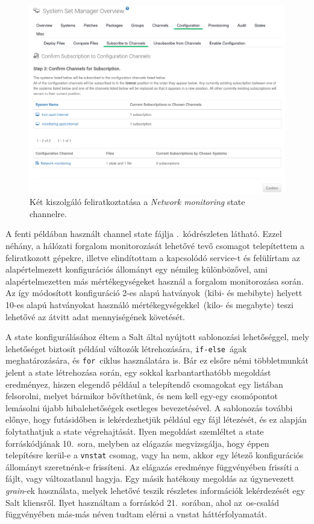 \begin{figure}[ht]
	\centering
	\includegraphics[width=15cm]{figures/uyuni-channelsub.png}
	\caption{Két kiszolgáló feliratkoztatása a \textit{Network monitoring} state channelre.}
	\label{fig:uyuni-channelsub}
\end{figure}

A fenti példában használt channel state fájlja .~kódrészleten látható. Ezzel néhány, a hálózati forgalom monitorozását lehetővé tevő csomagot telepítettem a feliratkozott gépekre, illetve elindítottam a kapcsolódó service-t és felülírtam az alapértelmezett konfigurációs állományt egy némileg különbözővel, ami alapértelmezetten más mértékegységeket használ a forgalom monitorozása során. Az így módosított konfiguráció 2-es alapú hatványok~(kibi- és mebibyte) helyett 10-es alapú hatványokat használó mértékegységekkel~(kilo- és megabyte) teszi lehetővé az átvitt adat mennyiségének követését.

A state konfigurálásához éltem a Salt által nyújtott sablonozási lehetőséggel, mely lehetőséget biztosít például változók létrehozására, \texttt{if-else}~ágak meghatározására, és \texttt{for}~ciklus használatára is. Bár ez elsőre némi többletmunkát jelent a state létrehozása során, egy sokkal karbantarthatóbb megoldást eredményez, hiszen elegendő például a telepítendő csomagokat egy listában felsorolni, melyet bármikor bővíthetünk, és nem kell egy-egy csomópontot lemásolni újabb hibalehetőségek esetleges bevezetésével. A sablonozás további előnye, hogy futásidőben is lekérdezhetjük például egy fájl létezését, és ez alapján folytathatjuk a state végrehajtását. Ilyen megoldást szemléltet a state forráskódjának 10.~sora, melyben az elágazás megvizsgálja, hogy éppen telepítésre kerül-e a \texttt{vnstat} csomag, vagy ha nem, akkor egy létező konfigurációs állományt szeretnénk-e frissíteni. Az elágazás eredménye függvényében frissíti a fájlt, vagy változatlanul hagyja. Egy másik hatékony megoldás az úgynevezett \textit{grain}-ek használata, melyek lehetővé teszik részletes információk lekérdezését egy Salt kliensről. Ilyet használtam a forráskód 21.~sorában, ahol az~\acrshort{os}-család függvényében más-más néven tudtam elérni a vnstat háttérfolyamatát.

